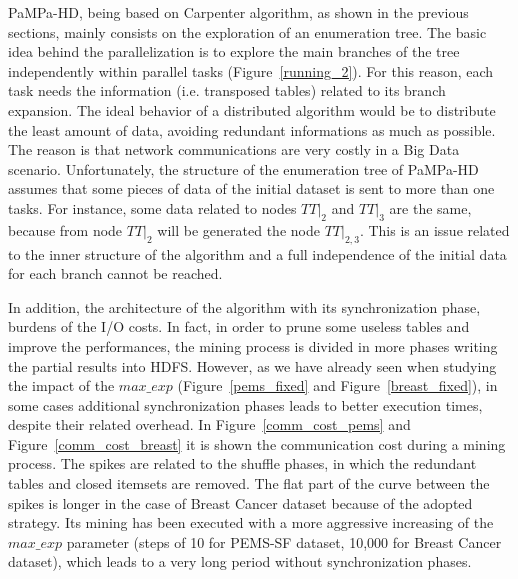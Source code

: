 PaMPa-HD, being based on Carpenter algorithm, as shown in the previous sections, mainly consists on the exploration of an enumeration tree. The basic idea behind the parallelization is to explore the main branches of the tree independently within parallel tasks (Figure~\ref{running_2}). For this reason, each task needs the information (i.e. transposed tables) related to its branch expansion. 
The ideal behavior of a distributed algorithm would be to distribute the least amount of data, avoiding redundant informations as much as possible. The reason is that network communications are very costly in a Big Data scenario.
Unfortunately, the structure of the enumeration tree of PaMPa-HD assumes that some pieces of data of the initial dataset is sent to more than one tasks. For instance, some data related to nodes $TT|_{2}$ and $TT|_{3}$ are the same, because from node $TT|_{2}$ will be generated the node $TT|_{2, 3}$. This is an issue related to the inner structure of the algorithm and a full independence of the initial data for each branch cannot be reached.

In addition, the architecture of the algorithm with its synchronization phase, burdens of the I/O costs. In fact, in order to prune some useless tables and improve the performances, the mining process is divided in more phases writing the partial results into HDFS. 
However, as we have already seen when studying the impact of the $max\_exp$ (Figure~\ref{pems_fixed} and Figure~\ref{breast_fixed}), in some cases additional synchronization phases leads to better execution times, despite their related overhead.
In Figure~\ref{comm_cost_pems} and Figure~\ref{comm_cost_breast} it is shown the communication cost during a mining process. The spikes are related to the shuffle phases, in which the redundant tables and closed itemsets are removed.
The flat part of the curve between the spikes is longer in the case of Breast Cancer dataset because of the adopted strategy. Its mining has been executed with a more aggressive increasing of the $max\_exp$ parameter (steps of 10 for PEMS-SF dataset, 10,000 for Breast Cancer dataset), which leads to a very long period without synchronization phases.


